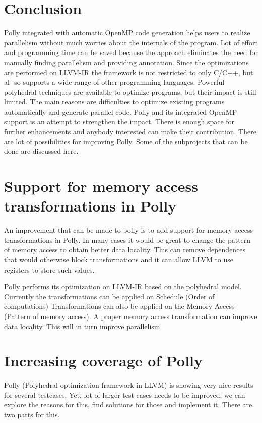 \label{chap:future}

\section{Conclusion}
Polly integrated with automatic OpenMP code generation helps users to
realize parallelism without much worries about the internals of the program.
Lot of effort and programming time can be saved because
the approach eliminates the need for manually finding parallelism and providing annotation.
Since the optimizations are performed on LLVM-IR the framework is not restricted to only C/C++, but al-
so supports a wide range of other programming languages.
Powerful polyhedral techniques are available to optimize programs, but their impact is still limited. The main reasons
are difficulties to optimize existing programs automatically and generate parallel code. Polly and its integrated OpenMP support
is an attempt to strengthen the impact. There is enough space for further enhancements
and anybody interested can make their contribution. 
There are lot of possibilities for improving Polly. Some of the subprojects
that can be done are discussed here.

\section{Support for memory access transformations in Polly}
An improvement that can be made to polly is to add support for memory access transformations in Polly.
In many cases it would be great to change the pattern of memory access to obtain better data locality.
This can remove dependences that would otherwise block transformations and it can allow LLVM to use registers to store such values.

Polly performs its optimization on LLVM-IR based on the polyhedral model. Currently the transformations can be applied on Schedule (Order of computations)
Transformations can also be applied on the Memory Access (Pattern of memory access). A proper memory access transformation can improve data locality. This will in turn improve parallelism.

\section{Increasing coverage of Polly}

Polly (Polyhedral optimization framework in LLVM) is showing very nice results for
several testcases. Yet, lot of larger test cases needs to be improved. we can explore
the reasons for this, find solutions for those and implement it. There are two parts for this.

